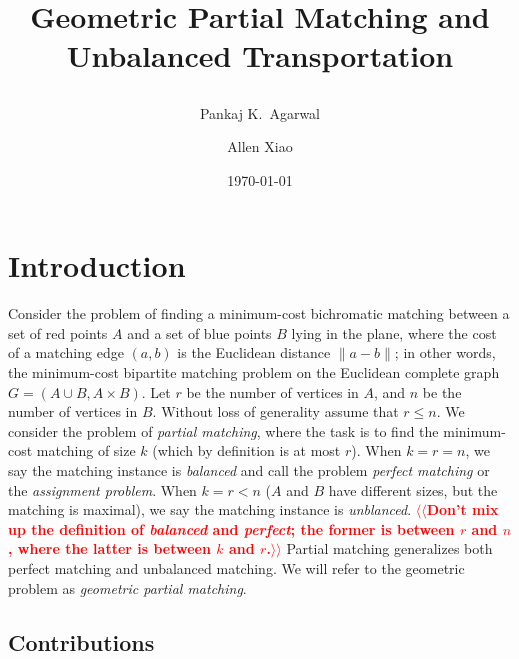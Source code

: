 \documentclass[11pt]{article}
\title{ Geometric Partial Matching and Unbalanced Transportation %
\date{\today} %
\author{
Pankaj K.\ Agarwal
\and
Allen Xiao
}
}
\makeatletter
\theoremstyle{plain}
\numberwithin{figure}{section}
\def\n@te#1{\textsf{\boldmath \textbf{$\langle\!\langle$#1$\rangle\!\rangle$}}\leavevmode}
\def\note#1{\textcolor{red}{\n@te{#1}}}
\makeatother
\begin{document}
\maketitle

\section{Introduction}

Consider the problem of finding a minimum-cost bichromatic matching between
a set of red points $A$ and a set of blue points $B$ lying in the plane,
where the cost of a matching edge $(a, b)$ is the Euclidean distance
$\|a - b\|$;
in other words, the minimum-cost bipartite matching problem on the Euclidean
complete graph $G = (A \cup B, A \times B)$.
Let $r$ be the number of vertices in $A$, and $n$ be the number of vertices in $B$.
Without loss of generality assume that $r \leq n$.
We consider the problem of \emph{partial matching}, where the task is to
find the minimum-cost matching of size $k$ (which by definition is at most $r$).
When $k = r = n$, we say the matching instance is \emph{balanced}
and call the problem \emph{perfect matching} or the \emph{assignment problem}.
When $k = r < n$ ($A$ and $B$ have different sizes, but the matching is
maximal), we say the matching instance is \emph{unblanced}.
\note{Don't mix up the definition of \emph{balanced} and \emph{perfect}; the former is between $r$ and $n$, where the latter is between $k$ and $r$.}
Partial matching generalizes both perfect matching and unbalanced matching.
We will refer to the geometric problem as \emph{geometric partial matching}.



\subsection{Contributions}
\end{document}
